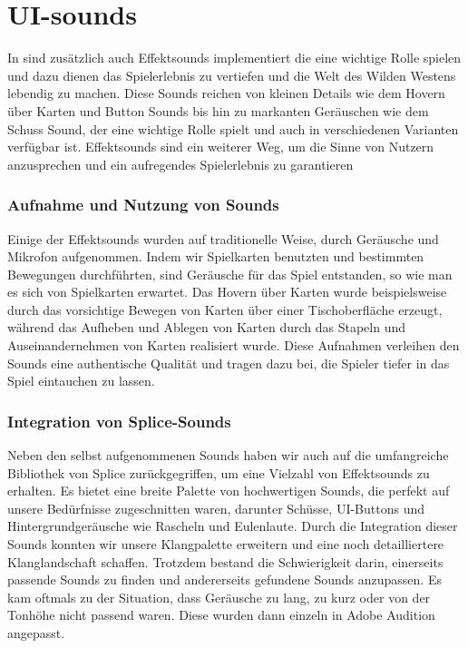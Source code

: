 
\section{UI-sounds}\label{sec:ui-sounds}

\renewcommand{\kapitelautor}{Autor: Nils Hubmann}

%
In \ff sind zusätzlich auch Effektsounds implementiert die eine wichtige Rolle spielen und dazu dienen das Spielerlebnis zu vertiefen und die Welt des Wilden Westens lebendig zu machen.
Diese Sounds reichen von kleinen Details wie dem Hovern über Karten und Button Sounds bis hin zu markanten Geräuschen wie dem Schuss Sound, der eine wichtige Rolle spielt und auch in verschiedenen Varianten verfügbar ist.
Effektsounds sind ein weiterer Weg, um die Sinne von Nutzern anzusprechen und ein aufregendes Spielerlebnis zu garantieren

\subsubsection{Aufnahme und Nutzung von Sounds}\label{subsubsec:Sound-Aufnahme}
Einige der Effektsounds wurden auf traditionelle Weise, durch Geräusche und Mikrofon aufgenommen.
Indem wir Spielkarten benutzten und bestimmten Bewegungen durchführten, sind Geräusche für das Spiel entstanden, so wie man es sich von Spielkarten erwartet.
Das Hovern über Karten wurde beispielsweise durch das vorsichtige Bewegen von Karten über einer Tischoberfläche erzeugt, während das Aufheben und Ablegen von Karten durch das Stapeln und Auseinandernehmen von Karten realisiert wurde.
Diese Aufnahmen verleihen den Sounds eine authentische Qualität und tragen dazu bei, die Spieler tiefer in das Spiel eintauchen zu lassen.

\subsubsection{Integration von Splice-Sounds}\label{subsubsec:Splice-Sounds}
Neben den selbst aufgenommenen Sounds haben wir auch auf die umfangreiche Bibliothek von Splice zurückgegriffen, um eine Vielzahl von Effektsounds zu erhalten.
Es bietet eine breite Palette von hochwertigen Sounds, die perfekt auf unsere Bedürfnisse zugeschnitten waren, darunter Schüsse, UI-Buttons und Hintergrundgeräusche wie Rascheln und Eulenlaute.
Durch die Integration dieser Sounds konnten wir unsere Klangpalette erweitern und eine noch detailliertere Klanglandschaft schaffen.
Trotzdem bestand die Schwierigkeit darin, einerseits passende Sounds zu finden und andererseits gefundene Sounds anzupassen.
Es kam oftmals zu der Situation, dass Geräusche zu lang, zu kurz oder von der Tonhöhe nicht passend waren.
Diese wurden dann einzeln in Adobe Audition angepasst.

